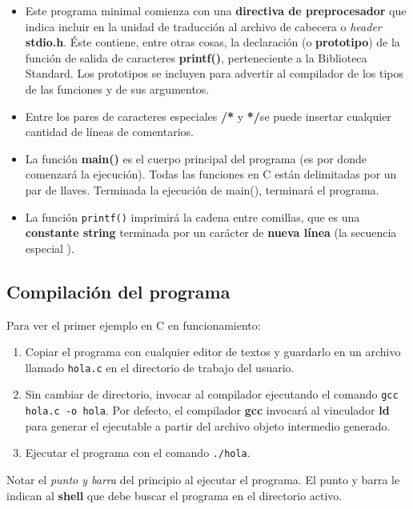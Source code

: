 \begin{itemize}
\item Este programa minimal comienza con una \textbf{directiva de preprocesador} que indica incluir en la unidad de traducción al
archivo de cabecera o \textit{header} \textbf{stdio.h}. Éste contiene, entre otras
cosas, la declaración (o \textbf{prototipo}) de la función de
salida de caracteres \textbf{printf()}, perteneciente a la Biblioteca Standard. Los prototipos se incluyen para
advertir al compilador de los tipos de las funciones y de sus
argumentos. 
\item Entre los pares de caracteres especiales \textbf{/*} y \textbf{*/}se puede insertar cualquier cantidad de líneas de comentarios. 
\item La función \textbf{main()} es el cuerpo principal del programa
(es por donde comenzará la ejecución). Todas las funciones en C están delimitadas por un par de llaves. Terminada la ejecución de
main(), terminará el programa. 
\item La función \texttt{printf()} imprimirá la cadena entre comillas, que es
una \textbf{constante string} terminada por un carácter de
\textbf{nueva línea} (la secuencia especial ). 
\end{itemize}

\subsection{Compilación del programa}
Para ver el primer ejemplo en C en funcionamiento:

\begin{enumerate}
	\item Copiar el programa con cualquier editor de textos y guardarlo en un archivo llamado \texttt{hola.c} en el directorio de trabajo del usuario.
	\item Sin cambiar de directorio, invocar al compilador ejecutando el comando \lstinline{gcc hola.c -o hola}. Por defecto, el compilador \textbf{gcc} invocará al vinculador \textbf{ld} para generar el ejecutable a partir del archivo objeto intermedio generado. 
	\item Ejecutar el programa con el comando \lstinline{./hola}. 
\end{enumerate}

Notar el \textit{punto y barra} del principio al ejecutar el programa. El punto y barra le indican al \textbf{shell} que debe buscar el programa en el directorio activo.

